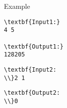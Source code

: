 Example
\begin{verbatim}
\textbf{Input1:}
4 5

\textbf{Output1:}
128205\end{verbatim}
\begin{verbatim}
\textbf{Input2:
\\}2 1\end{verbatim}
\begin{verbatim}
\textbf{Output2:
\\}0\end{verbatim}